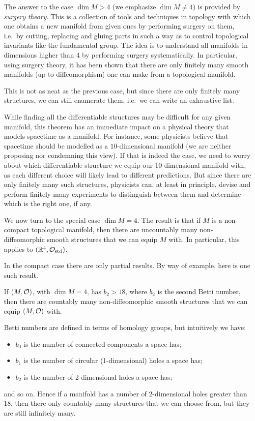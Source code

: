 The answer to the case $\dim M > 4$ (we emphasize $\dim M \neq 4$) is provided by \emph{surgery theory}. This is a collection of tools and techniques in topology with which one obtains a new manifold from given ones by performing surgery on them, i.e.\ by cutting, replacing and gluing parts in such a way as to control topological invariants like the fundamental group. The idea is to understand all manifolds in dimensions higher than 4 by performing surgery systematically. In particular, using  surgery theory, it has been shown that there are only finitely many smooth manifolds (up to diffeomorphism) one can make from a topological manifold.

This is not as neat as the previous case, but since there are only finitely many structures, we can still enumerate them, i.e.\ we can write an exhaustive list.

While finding all the differentiable structures may be difficult for any given manifold, this theorem has an immediate impact on a physical theory that models spacetime as a manifold. For instance, some physicists believe that spacetime should be modelled as a $10$-dimensional manifold (we are neither proposing nor condemning this view). If that is indeed the case, we need to worry about which differentiable structure we equip our 10-dimensional manifold with, as each different choice will likely lead to different predictions. But since there are only finitely many such structures, physicists can, at least in principle, devise and perform finitely many experiments to distinguish between them and determine which is the right one, if any.

We now turn to the special case $\dim M = 4$. The result is that if $M$ is a non-compact topological manifold, then there are uncountably many non-diffeomorphic smooth structures that we can equip $M$ with. In particular, this applies to $(\mathbb{R}^4,\mathcal{O}_\mathrm{std})$.

In the compact case there are only partial results. By way of example, here is one such result.

\bp
If $(M,\mathcal{O})$, with $\dim M = 4$, has $b_2>18$, where $b_2$ is the second Betti number, then there are countably many non-diffeomorphic smooth structures that we can equip $(M,\mathcal{O})$ with. 
\ep

Betti numbers are defined in terms of homology groups, but intuitively we have:
\begin{itemize}
\item $b_0$ is the number of connected components a space has;
\item $b_1$ is the number of circular (1-dimensional) holes a space has;
\item $b_2$ is the number of 2-dimensional holes a space has;
\end{itemize}
and so on. Hence if a manifold has a number of 2-dimensional holes greater than 18, then there only countably many structures that we can choose from, but they are still infinitely many.












